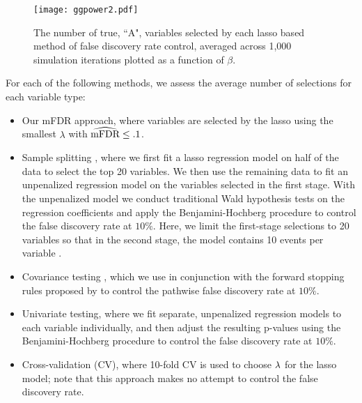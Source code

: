 \begin{figure} [htb!]
 \centering
  \texttt{[image: ggpower2.pdf]}
  \caption{\label{Fig:lassopower} The number of true, ``A", variables selected by each lasso based method of false discovery rate control, averaged across 1,000 simulation iterations plotted as a function of $\beta$. }
\end{figure}

For each of the following methods, we assess the average number of selections for each variable type:
\begin{itemize}
\item Our mFDR approach, where variables are selected by the lasso using the smallest $\lambda$ with $\widehat{\textrm{mFDR}} \leq .1$.
\item Sample splitting \citep{Sample_Splitting}, where we first fit a lasso regression model on half of the data to select the top 20 variables. We then use the remaining data to fit an unpenalized regression model on the variables selected in the first stage. With the unpenalized model we conduct traditional Wald hypothesis tests on the regression coefficients and apply the Benjamini-Hochberg procedure \citep{BH_1995} to control the false discovery rate at $10\%$. Here, we limit the first-stage selections to 20 variables so that in the second stage, the model contains 10 events per variable \citep{peduzzi_epv}.
\item Covariance testing \citep{CovTest}, which we use in conjunction with the forward stopping rules proposed by \citet{GSell2016} to control the pathwise false discovery rate at $10\%$. 
\item Univariate testing, where we fit separate, unpenalized regression models to each variable individually, and then adjust the resulting p-values using the Benjamini-Hochberg procedure to control the false discovery rate at $10\%$.
\item Cross-validation (CV), where 10-fold CV is used to choose $\lambda$ for the lasso model; note that this approach makes no attempt to control the false discovery rate.
\end{itemize}

